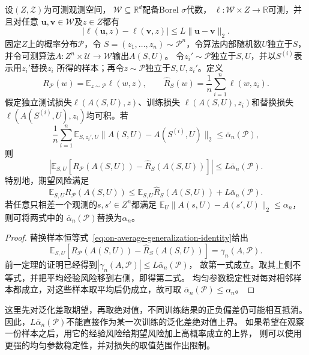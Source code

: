 \begin{theorem}[参数稳定性与期望泛化差]
\label{thm:parameter-expected-generalization}
设$(Z,\mathcal Z)$为可测观测空间，
$\mathcal W\subseteq\mathbb R^d$配备Borel $\sigma$代数，
$\ell:\mathcal W\times Z\to\mathbb R$可测，并且对任意
$\bm u,\bm v\in\mathcal W$及$z\in Z$都有
\[
 |\ell(\bm u,z)-\ell(\bm v,z)|
 \leq L\|\bm u-\bm v\|_2.
\]
固定$Z$上的概率分布$\mathcal P$，令
$S=(z_1,\ldots,z_n)\sim\mathcal P^n$，令算法内部随机数$U$独立于$S$，
并令可测算法$A:Z^n\times\mathcal U\to\mathcal W$输出$A(S,U)$。
令$z_i'\sim\mathcal P$独立于$S,U$，并以$S^{(i)}$表示用$z_i'$替换$z_i$
所得的样本；再令$z\sim\mathcal P$独立于$S,U,z_i'$。定义
\[
 R_{\mathcal P}(w)=\mathbb E_{z\sim\mathcal P}\ell(w,z),
 \qquad
 \hat R_S(w)=\frac1n\sum_{i=1}^n\ell(w,z_i).
\]
假定独立测试损失$\ell(A(S,U),z)$、训练损失
$\ell(A(S,U),z_i)$和替换损失$\ell(A(S^{(i)},U),z_i)$均可积。若
\[
 \frac1n\sum_{i=1}^n\mathbb E_{S,z_i',U}
 \|A(S,U)-A(S^{(i)},U)\|_2
 \leq\bar\alpha_n(\mathcal P),
\]
则
\begin{equation}
 \left|\mathbb E_{S,U}
 [R_{\mathcal P}(A(S,U))-\hat R_S(A(S,U))]\right|
 \leq L\bar\alpha_n(\mathcal P).
 \label{eq:parameter-generalization}
\end{equation}
特别地，期望风险满足
\[
 \mathbb E_{S,U}R_{\mathcal P}(A(S,U))
 \leq\mathbb E_{S,U}\hat R_S(A(S,U))+L\bar\alpha_n(\mathcal P).
\]
若任意只相差一个观测的$s,s'\in Z^n$都满足
$\mathbb E_U\|A(s,U)-A(s',U)\|_2\leq\alpha_n$，则可将两式中的
$\bar\alpha_n(\mathcal P)$替换为$\alpha_n$。
\end{theorem}
\begin{proof}
替换样本恒等式~\eqref{eq:on-average-generalization-identity}给出
\[
 \mathbb E_{S,U}[R_{\mathcal P}(A(S,U))-\hat R_S(A(S,U))]
 =\gamma_n(A,\mathcal P).
\]
前一定理的证明已经得到$|\gamma_n(A,\mathcal P)|\leq L\bar\alpha_n(\mathcal P)$，
故第一式成立。取其上侧不等式，并把平均经验风险移到右侧，即得第二式。
均匀参数稳定性对每对相邻样本都成立，对这些样本取平均后仍成立，故可取
$\bar\alpha_n(\mathcal P)\leq\alpha_n$。
\end{proof}

这里先对泛化差取期望，再取绝对值，不同训练结果的正负偏差仍可能相互抵消。
因此，$L\bar\alpha_n(\mathcal P)$不能直接作为某一次训练的泛化差绝对值上界。
如果希望在观察一份样本之后，用它的经验风险给期望风险加上高概率成立的上界，
则可以使用更强的均匀参数稳定性，并对损失的取值范围作出限制。

